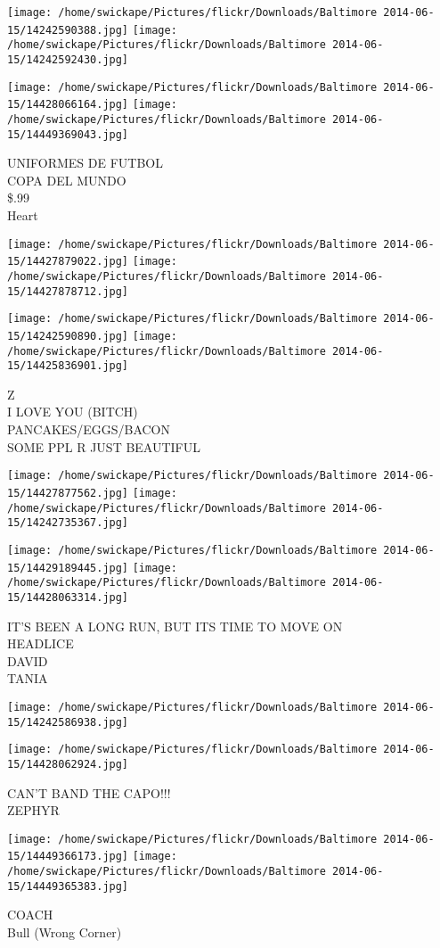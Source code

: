\documentclass[10pt,letterpaper]{article}
\begin{document}
\texttt{[image: /home/swickape/Pictures/flickr/Downloads/Baltimore 2014-06-15/14242590388.jpg]}
\texttt{[image: /home/swickape/Pictures/flickr/Downloads/Baltimore 2014-06-15/14242592430.jpg]}

\texttt{[image: /home/swickape/Pictures/flickr/Downloads/Baltimore 2014-06-15/14428066164.jpg]}
\texttt{[image: /home/swickape/Pictures/flickr/Downloads/Baltimore 2014-06-15/14449369043.jpg]}

UNIFORMES DE FUTBOL\\
COPA DEL MUNDO\\
\$.99\\
Heart\\
\pagebreak

\texttt{[image: /home/swickape/Pictures/flickr/Downloads/Baltimore 2014-06-15/14427879022.jpg]}
\texttt{[image: /home/swickape/Pictures/flickr/Downloads/Baltimore 2014-06-15/14427878712.jpg]}

\texttt{[image: /home/swickape/Pictures/flickr/Downloads/Baltimore 2014-06-15/14242590890.jpg]}
\texttt{[image: /home/swickape/Pictures/flickr/Downloads/Baltimore 2014-06-15/14425836901.jpg]}

Z\\
I LOVE YOU (BITCH)\\
PANCAKES/EGGS/BACON\\
SOME PPL R JUST BEAUTIFUL\\
\pagebreak

\texttt{[image: /home/swickape/Pictures/flickr/Downloads/Baltimore 2014-06-15/14427877562.jpg]}
\texttt{[image: /home/swickape/Pictures/flickr/Downloads/Baltimore 2014-06-15/14242735367.jpg]}

\texttt{[image: /home/swickape/Pictures/flickr/Downloads/Baltimore 2014-06-15/14429189445.jpg]}
\texttt{[image: /home/swickape/Pictures/flickr/Downloads/Baltimore 2014-06-15/14428063314.jpg]}

IT'S BEEN A LONG RUN, BUT ITS TIME TO MOVE ON\\
HEADLICE\\
DAVID\\
TANIA\\
\pagebreak

\texttt{[image: /home/swickape/Pictures/flickr/Downloads/Baltimore 2014-06-15/14242586938.jpg]}

\vspace{0.25in}
\texttt{[image: /home/swickape/Pictures/flickr/Downloads/Baltimore 2014-06-15/14428062924.jpg]}

CAN'T BAND THE CAPO!!!\\
ZEPHYR\\
\pagebreak

\texttt{[image: /home/swickape/Pictures/flickr/Downloads/Baltimore 2014-06-15/14449366173.jpg]}
\texttt{[image: /home/swickape/Pictures/flickr/Downloads/Baltimore 2014-06-15/14449365383.jpg]}

COACH\\
Bull (Wrong Corner)\\
\pagebreak
\end{document}
